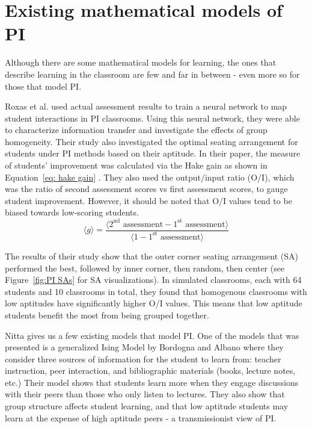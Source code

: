 \section{Existing mathematical models of PI}
Although there are some mathematical models for learning, the ones that describe learning in the classroom are few and far in between - even more so for those that model PI.

Roxas et al. \cite{roxas2010seating} used actual assessment results to train a neural network to map student interactions in PI classrooms. 
Using this neural network, they were able to characterize information transfer and investigate the effects of group homogeneity. 
Their study also investigated the optimal seating arrangement for students under PI methods based on their aptitude.
In their paper, the measure of students' improvement was calculated via the Hake gain as shown in Equation~\ref{eq: hake gain} \cite{hake1998}.
They also used the output/input ratio (O/I), which was the ratio of second assessment scores vs first assessment scores, to gauge student improvement.
However, it should be noted that O/I values tend to be biased towards low-scoring students.
\begin{equation}
    \label{eq: hake gain}
    \langle g \rangle = \frac{\langle 2^{\text{nd}}\text{ assessment} - 1^{\text{st}}\text{ assessment} \rangle}{\langle 1 - 1^{\text{st}}\text{ assessment} \rangle}
\end{equation}

The results of their study show that the outer corner seating arrangement (SA) performed the best, followed by inner corner, then random, then center (see Figure~\ref{fig:PI SAs} for SA visualizations).
In simulated classrooms, each with 64 students and 10 classrooms in total, they found that homogenous classrooms with low aptitudes have significantly higher O/I values.
This means that low aptitude students benefit the most from being grouped together.

Nitta \cite{nitta2019mathematical} gives us a few existing models that model PI. 
One of the models that was presented is a generalized Ising Model by Bordogna and Albano \cite{bordogna2001theoretical,bordogna2003simulation} where they consider three sources of information for the student to learn from: teacher instruction, peer interaction, and bibliographic materials (books, lecture notes, etc.)
Their model shows that students learn more when they engage discussions with their peers than those who only listen to lectures.
They also show that group structure affects student learning, and that low aptitude students may learn at the expense of high aptitude peers - a transmissionist view of PI.

